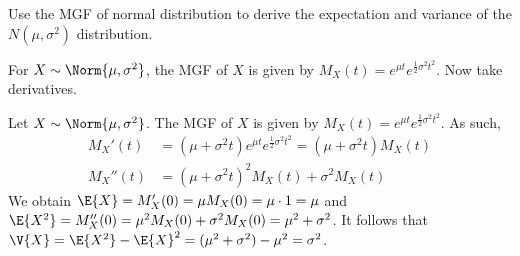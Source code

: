 	\begin{exercise}\label{ex:chap06:013}
		Use the MGF of normal distribution to derive the expectation and variance of the $N(\mu,\sigma^2)$ distribution. 
		\begin{hint}
			For $X \sim \Norm{\mu, \sigma^2}$, the MGF of $X$ is given by $M_X(t) = e^{\mu t} e^{\frac{1}{2} \sigma^2 t^2}$. Now take derivatives.
		\end{hint}
		\begin{solution}
			Let $X \sim \Norm{\mu, \sigma^2}$. The MGF of $X$ is given by $M_X(t) = e^{\mu t} e^{\frac{1}{2} \sigma^2 t^2}$. As such,
			\begin{align*}
				M_X'(t) & = (\mu + \sigma^2 t) e^{\mu t} e^{\frac{1}{2} \sigma^2 t^2} = (\mu + \sigma^2 t) M_X(t) \\
				M_X''(t) & = (\mu + \sigma^2 t)^2 M_X(t) + \sigma^2 M_X(t)
			\end{align*}
			We obtain $\E{X} = M_X'(0) = \mu M_X(0) = \mu \cdot 1 = \mu$ and $\E{X^2} = M_X''(0) = \mu^2 M_X(0) + \sigma^2 M_X(0) = \mu^2 + \sigma^2$. It follows that $\V{X} = \E{X^2} - \E{X}^2 = (\mu^2 + \sigma^2) - \mu^2 = \sigma^2$.
		\end{solution}
	\end{exercise}
	
